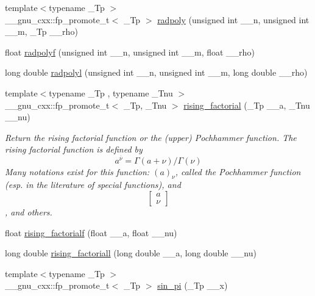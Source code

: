 \begin{DoxyCompactItemize}
\item 
{\footnotesize template$<$typename \+\_\+\+Tp $>$ }\\\+\_\+\+\_\+gnu\+\_\+cxx\+::fp\+\_\+promote\+\_\+t$<$ \+\_\+\+Tp $>$ \hyperlink{group__mathsf__gnu_ga195db2592888b7a8df870d9eaeff8d05}{radpoly} (unsigned int \+\_\+\+\_\+n, unsigned int \+\_\+\+\_\+m, \+\_\+\+Tp \+\_\+\+\_\+rho)
\item 
float \hyperlink{group__mathsf__gnu_ga8a98d7c7c14f1aadff90123a114fa2c9}{radpolyf} (unsigned int \+\_\+\+\_\+n, unsigned int \+\_\+\+\_\+m, float \+\_\+\+\_\+rho)
\item 
long double \hyperlink{group__mathsf__gnu_ga377febebd1096400897170bb7a76cd3a}{radpolyl} (unsigned int \+\_\+\+\_\+n, unsigned int \+\_\+\+\_\+m, long double \+\_\+\+\_\+rho)
\item 
{\footnotesize template$<$typename \+\_\+\+Tp , typename \+\_\+\+Tnu $>$ }\\\+\_\+\+\_\+gnu\+\_\+cxx\+::fp\+\_\+promote\+\_\+t$<$ \+\_\+\+Tp, \+\_\+\+Tnu $>$ \hyperlink{group__mathsf__gnu_gae8c36a0e1f60254cf212a3806f7c675c}{rising\+\_\+factorial} (\+\_\+\+Tp \+\_\+\+\_\+a, \+\_\+\+Tnu \+\_\+\+\_\+nu)
\begin{DoxyCompactList}\small\item\em Return the rising factorial function or the (upper) Pochhammer function. The rising factorial function is defined by \[ a^{\overline{\nu}} = \Gamma(a + \nu) / \Gamma(\nu) \] Many notations exist for this function\+: $ (a)_\nu $, called the Pochhammer function (esp. in the literature of special functions), and \[ \left[ \begin{array}{c} a \\ \nu \end{array} \right] \], and others. \end{DoxyCompactList}\item 
float \hyperlink{group__mathsf__gnu_ga10da05b995a42f0b0625e61186af7449}{rising\+\_\+factorialf} (float \+\_\+\+\_\+a, float \+\_\+\+\_\+nu)
\item 
long double \hyperlink{group__mathsf__gnu_gac9a399ae01c315aa78a64b445795d974}{rising\+\_\+factoriall} (long double \+\_\+\+\_\+a, long double \+\_\+\+\_\+nu)
\item 
{\footnotesize template$<$typename \+\_\+\+Tp $>$ }\\\+\_\+\+\_\+gnu\+\_\+cxx\+::fp\+\_\+promote\+\_\+t$<$ \+\_\+\+Tp $>$ \hyperlink{group__mathsf__gnu_ga220f8a9a0477697cff96e84dc911d5f0}{sin\+\_\+pi} (\+\_\+\+Tp \+\_\+\+\_\+x)
\item 

\end{DoxyCompactItemize}
